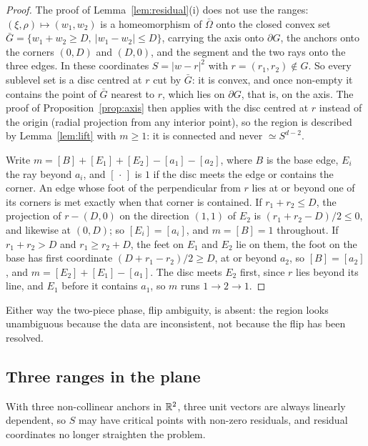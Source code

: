 \begin{proof}
The proof of Lemma~\ref{lem:residual}(i) does not use the ranges: $(\xi, \rho) \mapsto (w_1, w_2)$ is a homeomorphism of
$\bar\Omega$ onto the closed convex set $\bar G = \{w_1 + w_2 \ge D,\ |w_1 - w_2| \le D\}$, carrying the axis onto $\partial G$,
the anchors onto the corners $(0, D)$ and $(D, 0)$, and the segment and the two rays onto the three edges. In these
coordinates $S = |w - r|^2$ with $r = (r_1, r_2) \notin G$. So every sublevel set is a disc centred at $r$ cut by
$\bar G$: it is convex, and once non-empty it contains the point of $\bar G$ nearest to $r$, which lies on $\partial G$,
that is, on the axis. The proof of Proposition~\ref{prop:axis} then applies with the disc centred at $r$ instead of the
origin (radial projection from any interior point), so the region is described by Lemma~\ref{lem:lift} with $m \ge 1$:
it is connected and never $\simeq S^{d-2}$.

Write $m = [B] + [E_1] + [E_2] - [a_1] - [a_2]$, where $B$ is the base edge, $E_i$ the ray beyond $a_i$, and $[\,\cdot\,]$
is $1$ if the disc meets the edge or contains the corner. An edge whose foot of the perpendicular from $r$ lies at or
beyond one of its corners is met exactly when that corner is contained. If $r_1 + r_2 \le D$, the projection of
$r - (D, 0)$ on the direction $(1, 1)$ of $E_2$ is $(r_1 + r_2 - D)/2 \le 0$, and likewise at $(0, D)$; so
$[E_i] = [a_i]$, and $m = [B] = 1$ throughout. If $r_1 + r_2 > D$ and $r_1 \ge r_2 + D$, the feet on $E_1$ and $E_2$ lie on
them, the foot on the base has first coordinate $(D + r_1 - r_2)/2 \ge D$, at or beyond $a_2$, so $[B] = [a_2]$, and
$m = [E_2] + [E_1] - [a_1]$. The disc meets $E_2$ first, since $r$ lies beyond its line, and $E_1$ before it contains
$a_1$, so $m$ runs $1 \to 2 \to 1$.
\end{proof}

Either way the two-piece phase, flip ambiguity, is absent: the region looks unambiguous because the data are
inconsistent, not because the flip has been resolved.

\subsection{Three ranges in the plane}\label{sec:three}

With three non-collinear anchors in $\mathbb{R}^2$, three unit vectors are always linearly dependent, so $S$ may have critical
points with non-zero residuals, and residual coordinates no longer straighten the problem.

